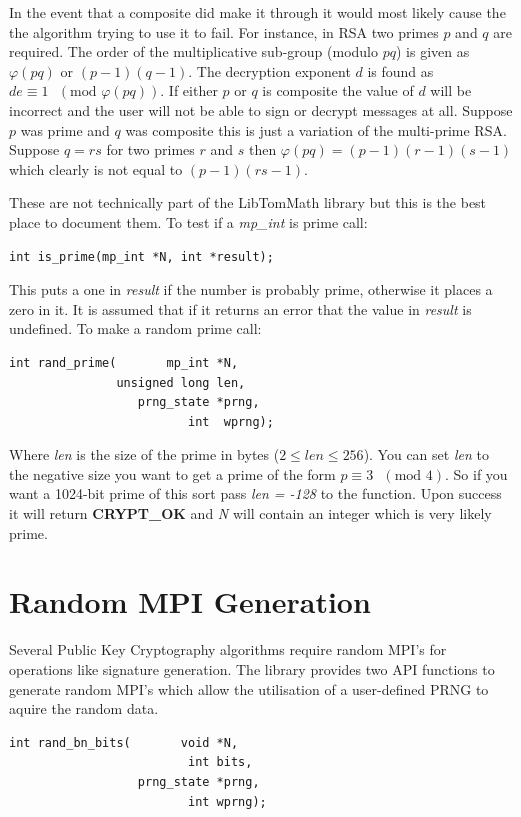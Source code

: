 \documentclass[synpaper]{book}
\def\phi{\varphi}
\newcommand{\mysection}[1]    %
	{                   %
	\section{#1}
   \markboth{\textsf{www.libtom.net}}{\thesection ~ {#1}}
	}
\begin{document}
In the event that a composite did make it through it would most likely cause the the algorithm trying to use it to fail.  For
instance, in RSA two primes $p$ and $q$ are required.  The order of the multiplicative sub-group (modulo $pq$) is given
as $\phi(pq)$ or $(p - 1)(q - 1)$.  The decryption exponent $d$ is found as $de \equiv 1\mbox{ }(\mbox{mod } \phi(pq))$.  If either $p$ or $q$ is composite the value of $d$ will be incorrect and the user
will not be able to sign or decrypt messages at all.  Suppose $p$ was prime and $q$ was composite this is just a variation of
the multi-prime RSA.  Suppose $q = rs$ for two primes $r$ and $s$ then $\phi(pq) = (p - 1)(r - 1)(s - 1)$ which clearly is
not equal to $(p - 1)(rs - 1)$.

These are not technically part of the LibTomMath library but this is the best place to document them.
To test if a \textit{mp\_int} is prime call:
\begin{verbatim}
int is_prime(mp_int *N, int *result);
\end{verbatim}
This puts a one in \textit{result} if the number is probably prime, otherwise it places a zero in it.  It is assumed that if
it returns an error that the value in \textit{result} is undefined.  To make
a random prime call:
\begin{verbatim}
int rand_prime(       mp_int *N,
               unsigned long len,
                  prng_state *prng,
                         int  wprng);
\end{verbatim}
Where \textit{len} is the size of the prime in bytes ($2 \le len \le 256$).  You can set \textit{len} to the negative size you want
to get a prime of the form $p \equiv 3\mbox{ }(\mbox{mod } 4)$.  So if you want a 1024-bit prime of this sort pass
\textit{len = -128} to the function.  Upon success it will return {\bf CRYPT\_OK} and \textit{N} will contain an integer which
is very likely prime.

\mysection{Random MPI Generation}

Several Public Key Cryptography algorithms require random MPI's for operations like signature generation.
The library provides two API functions to generate random MPI's which allow the utilisation of a user-defined PRNG to aquire the random data.

\begin{verbatim}
int rand_bn_bits(       void *N,
                         int bits,
                  prng_state *prng,
                         int wprng);
\end{verbatim}
\end{document}
